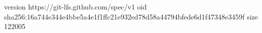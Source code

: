 version https://git-lfs.github.com/spec/v1
oid sha256:16a744e344e4bbe5a4e1f1ffc21e932ed78d58a44794bfede6d1f47348e3459f
size 122005
